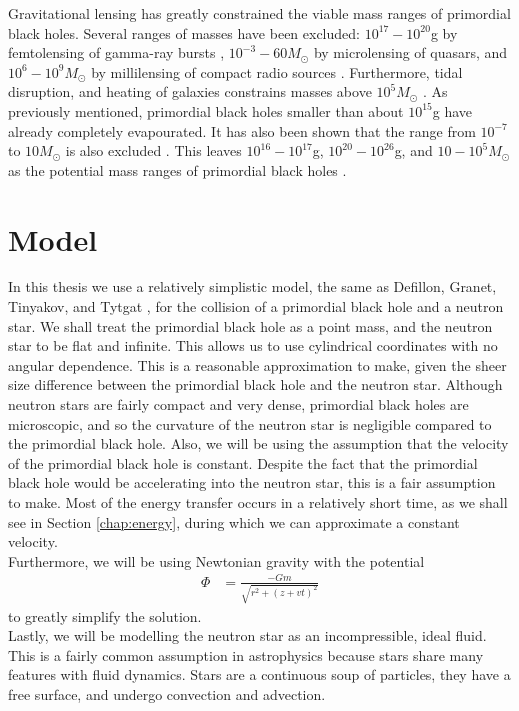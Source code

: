 Gravitational lensing has greatly constrained the viable mass ranges of primordial black holes. Several ranges of masses have been excluded: $10^{17}-10^{20}$g by femtolensing of gamma-ray bursts \cite{massfemt}, $10^{-3}-60 M_\odot$ by microlensing of quasars, and $10^6-10^9 M_\odot$ by millilensing of compact radio sources \cite{massmilli}. Furthermore, tidal disruption, and heating of galaxies constrains masses above $10^5 M_\odot$ \cite{massheavy}. As previously mentioned, primordial black holes smaller than about $10^{15}$g have already completely evapourated. It has also been shown that the range from $10^{-7}$ to $10 M_\odot$ is also excluded \cite{mass1}. This leaves $10^{16}-10^{17}$g, $10^{20}-10^{26}$g, and $10-10^{5}M_\odot$ as the potential mass ranges of primordial black holes \cite{massrange}.

\section{Model}

In this thesis we use a relatively simplistic model, the same as Defillon, Granet, Tinyakov, and Tytgat \cite{tidalcapture}, for the collision of a primordial black hole and a neutron star. We shall treat the primordial black hole as a point mass, and the neutron star to be flat and infinite. This allows us to use cylindrical coordinates with no angular dependence. This is a reasonable approximation to make, given the sheer size difference between the primordial black hole and the neutron star. Although neutron stars are fairly compact and very dense, primordial black holes are microscopic, and so the curvature of the neutron star is negligible compared to the primordial black hole. Also, we will be using the assumption that the velocity of the primordial black hole is constant. Despite the fact that the primordial black hole would be accelerating into the neutron star, this is a fair assumption to make. Most of the energy transfer occurs in a relatively short time, as we shall see in Section \ref{chap:energy}, during which we can approximate a constant velocity. \\

Furthermore, we will be using Newtonian gravity with the potential
\begin{align}
\label{eq:gravity}
\Phi &= \frac{-Gm}{\sqrt{r^2 + (z + vt)^2}}
\end{align}
to greatly simplify the solution. \\

Lastly, we will be modelling the neutron star as an incompressible, ideal fluid. This is a fairly common assumption in astrophysics because stars share many features with fluid dynamics. Stars are a continuous soup of particles, they have a free surface, and undergo convection and advection.

